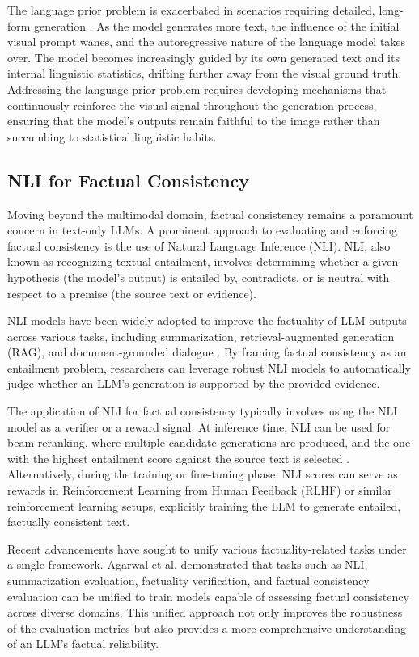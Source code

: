\documentclass[11pt,a4paper]{article}
\begin{document}
The language prior problem is exacerbated in scenarios requiring detailed, long-form generation . As the model generates more text, the influence of the initial visual prompt wanes, and the autoregressive nature of the language model takes over. The model becomes increasingly guided by its own generated text and its internal linguistic statistics, drifting further away from the visual ground truth. Addressing the language prior problem requires developing mechanisms that continuously reinforce the visual signal throughout the generation process, ensuring that the model's outputs remain faithful to the image rather than succumbing to statistical linguistic habits.

\subsection{NLI for Factual Consistency}

Moving beyond the multimodal domain, factual consistency remains a paramount concern in text-only LLMs. A prominent approach to evaluating and enforcing factual consistency is the use of Natural Language Inference (NLI). NLI, also known as recognizing textual entailment, involves determining whether a given hypothesis (the model's output) is entailed by, contradicts, or is neutral with respect to a premise (the source text or evidence).

NLI models have been widely adopted to improve the factuality of LLM outputs across various tasks, including summarization, retrieval-augmented generation (RAG), and document-grounded dialogue \cite{Harary_2025_Prefixnli}. By framing factual consistency as an entailment problem, researchers can leverage robust NLI models to automatically judge whether an LLM's generation is supported by the provided evidence.

The application of NLI for factual consistency typically involves using the NLI model as a verifier or a reward signal. At inference time, NLI can be used for beam reranking, where multiple candidate generations are produced, and the one with the highest entailment score against the source text is selected \cite{Harary_2025_Prefixnli}. Alternatively, during the training or fine-tuning phase, NLI scores can serve as rewards in Reinforcement Learning from Human Feedback (RLHF) or similar reinforcement learning setups, explicitly training the LLM to generate entailed, factually consistent text.

Recent advancements have sought to unify various factuality-related tasks under a single framework. Agarwal et al. \cite{Agarwal_2024_Zero} demonstrated that tasks such as NLI, summarization evaluation, factuality verification, and factual consistency evaluation can be unified to train models capable of assessing factual consistency across diverse domains. This unified approach not only improves the robustness of the evaluation metrics but also provides a more comprehensive understanding of an LLM's factual reliability.
\end{document}
